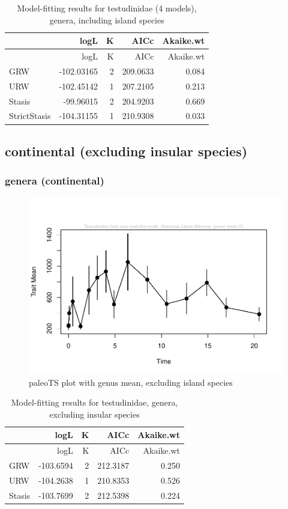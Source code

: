 \documentclass[]{article}
\begin{document}
\begin{longtable}[]{@{}lrrrr@{}}
\caption{Model-fitting results for testudinidae (4 models), genera,
including island species}\tabularnewline
\toprule
& logL & K & AICc & Akaike.wt\tabularnewline
\midrule
\endfirsthead
\toprule
& logL & K & AICc & Akaike.wt\tabularnewline
\midrule
\endhead
GRW & -102.03165 & 2 & 209.0633 & 0.084\tabularnewline
URW & -102.45142 & 1 & 207.2105 & 0.213\tabularnewline
Stasis & -99.96015 & 2 & 204.9203 & 0.669\tabularnewline
StrictStasis & -104.31155 & 1 & 210.9308 & 0.033\tabularnewline
\bottomrule
\end{longtable}

\newpage

\subsection{continental (excluding insular
species)}\label{continental-excluding-insular-species}

\subsubsection{genera (continental)}\label{genera-continental}

\begin{figure}[htbp]
\centering
\includegraphics{MA_JJ_files/figure-latex/paleoTS plot with genus mean, excluding island species-1.pdf}
\caption{paleoTS plot with genus mean, excluding island species}
\end{figure}

\begin{longtable}[]{@{}lrrrr@{}}
\caption{Model-fitting results for testudinidae, genera, excluding
insular species}\tabularnewline
\toprule
& logL & K & AICc & Akaike.wt\tabularnewline
\midrule
\endfirsthead
\toprule
& logL & K & AICc & Akaike.wt\tabularnewline
\midrule
\endhead
GRW & -103.6594 & 2 & 212.3187 & 0.250\tabularnewline
URW & -104.2638 & 1 & 210.8353 & 0.526\tabularnewline
Stasis & -103.7699 & 2 & 212.5398 & 0.224\tabularnewline
\bottomrule
\end{longtable}
\end{document}
